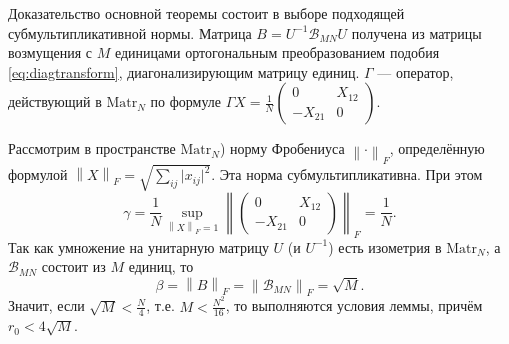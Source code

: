 Доказательство основной теоремы
состоит в выборе подходящей субмультипликативной нормы.
Матрица \( B = U^{-1} \mathscr{B}_{MN} U \)
получена из матрицы возмущения с \( M \) единицами
ортогональным преобразованием подобия \eqref{eq:diagtransform},
диагонализирующим матрицу единиц.
\( \Gamma \) --- оператор, действующий в \( \mathrm{Matr}_{N} \)
по формуле
\( { \Gamma X = \frac1N \begin{pmatrix}0 & X_{12} \\ -X_{21} & 0\end{pmatrix} } \).

Рассмотрим в пространстве \( \mathrm{Matr}_{N} \))
норму Фробениуса \( {\left\|\cdot\right\|}_{F} \),
определённую формулой
\( {\left\|X\right\|}_{F} = \sqrt{\sum_{ij} \lvert x_{ij}\rvert^2}. \)
Эта норма субмультипликативна.
При этом
\[ \gamma = \frac1N
            \sup_{{\left\|X\right\|}_{F}=1}{\left\|\begin{pmatrix}0 & X_{12} \\ -X_{21} & 0\end{pmatrix}\right\|}_{F}
          = \frac1N.
    \]
Так как умножение на унитарную матрицу \( U \)
    (и \( U^{-1} \)) есть изометрия в \( \mathrm{Matr}_{N} \),
    а \( \mathscr{B}_{MN} \) состоит из \( M \) единиц, то
\[
    \beta = {\left\|B\right\|}_{F} =
    {\left\|\mathscr{B}_{MN}\right\|}_{F} = \sqrt{M}.
    \]
Значит, если
\( \sqrt{M} < \frac{N}{4} \), т.е.
\( M < \frac{N^2}{16} \),
то выполняются условия леммы,
причём \( r_0 < 4\sqrt{M} \).
